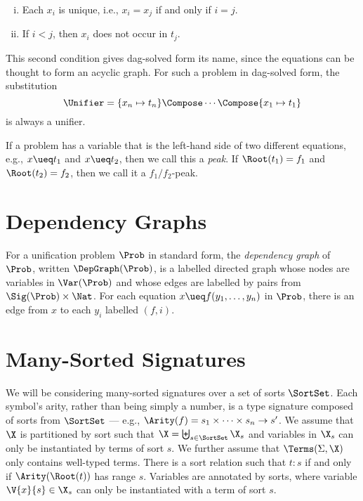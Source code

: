 \begin{enumerate}[(i)]
    \item Each $x_i$ is unique, i.e., $x_i = x_j$ if and only if $i = j$.
    \item If $i < j$, then $x_i$ does not occur in $t_j$.
\end{enumerate}

This second condition gives dag-solved form its name, since the equations can
be thought to form an acyclic graph. For such a problem in dag-solved form, the
substitution
\[\Unifier = \{ x_n \mapsto t_n \} \Compose \dotsb \Compose \{ x_1 \mapsto t_1 \}\]
is always a unifier.

If a problem has a variable that is the left-hand side of two different equations,
e.g., $x \ueq t_1$ and $x \ueq t_2$, then we call this a \emph{peak}. If
$\Root(t_1) = f_1$ and $\Root(t_2) = f_2$, then we call it a $f_1/f_2$-peak.

\section{Dependency Graphs}\label{sec:dep-graphs}

For a unification problem $\Prob$ in standard form, the \emph{dependency graph}
of $\Prob$, written $\DepGraph(\Prob)$, is a labelled directed graph whose
nodes are variables in $\Var(\Prob)$ and whose edges are labelled by pairs from
$\Sig(\Prob) \times \Nat$.  For each equation $x \ueq f(y_1, \dotsc, y_n)$ in
$\Prob$, there is an edge from $x$ to each $y_i$ labelled $(f, i)$.

\section{Many-Sorted Signatures}\label{sec:sorts}

We will be considering many-sorted signatures over a set of sorts $\SortSet$.
Each symbol's arity, rather than being simply a number, is a type signature
composed of sorts from $\SortSet$ --- e.g., $\Arity(f) = s_1 \times \dotsb \times
s_n \to s'$. We assume that $\X$ is partitioned by sort such that $\X =
\biguplus_{s \in \SortSet} \X_{s}$ and variables in $\X_{s}$ can only be
instantiated by terms of sort $s$. We further assume that $\Terms(\Sigma, \X)$
only contains well-typed terms. There is a sort relation such that $t : s$ if
and only if $\Arity(\Root(t))$ has range $s$. Variables are annotated by sorts,
where variable $\V{x}{s} \in \X_s$ can only be instantiated with a term of sort
$s$.

